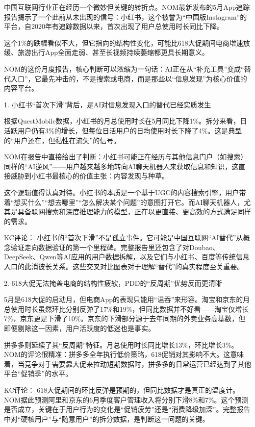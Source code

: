 \documentclass[11pt]{ctexart}
\begin{document}
中国互联网行业正在经历一个微妙但关键的转折点。NOM最新发布的5月App追踪报告揭示了一个此前从未出现的信号：小红书，这个被誉为“中国版Instagram”的平台，自2020年有追踪数据以来，首次出现了用户总使用时长同比下降。

这个1\%的跌幅看似不大，但它指向的结构性变化，可能比618大促期间电商增速放缓、旅游出行App全面走弱、甚至长视频持续萎缩都更具长期意义。

NOM的这份月度报告，核心判断可以浓缩为一句话：AI正在从“补充工具”变成“替代入口”，它最先冲击的，不是搜索或电商，而是那些以“信息发现”为核心价值的内容平台。

1. 小红书“首次下滑”背后，是AI对信息发现入口的替代已经实质发生

根据QuestMobile数据，小红书的月总使用时长在5月同比下降1\%。拆分来看，日活跃用户仍有3\%的增长，但每位日活用户的日均使用时长下降了4\%。这是典型的“用户还在，但黏性在流失”的信号。

NOM在报告中直接给出了判断：小红书可能正在经历与其他信息门户（如搜索）同样的“AI逆风”——用户越来越多地转向AI聊天机器人来获取信息和知识，这直接威胁到小红书最核心的价值主张：内容发现与种草。

这个逻辑值得认真对待。小红书的本质是一个基于UGC的内容搜索引擎，用户带着“想买什么”“想去哪里”“怎么解决某个问题”的意图打开它。而AI聊天机器人，尤其是具备联网搜索和深度推理能力的模型，正在以更直接、更高效的方式满足同样的需求。

KC评论： 小红书的“首次下滑”不是孤立事件。它可能是中国互联网“AI替代”从概念验证走向数据验证的第一个里程碑。完整报告里还包含了对Doubao、DeepSeek、Qwen等AI应用的用户数据拆解，以及它们与小红书、百度等传统信息入口的此消彼长关系。这些交叉对比图表对于理解“替代”的真实程度至关重要。

2. 618大促无法掩盖电商的结构性疲软，PDD的“反周期”优势反而更清晰

5月是618大促的启动月，但电商App的表现只能用“温吞”来形容。淘宝和京东的月总使用时长虽然环比分别反弹了17\%和19\%，但同比数据并不好看——淘宝仅增长7\%，京东更是下滑了10\%。京东的下滑部分源于去年同期的外卖业务高基数，但即便剔除这一因素，用户活跃度的低迷也是事实。

拼多多则延续了其“反周期”特征。月总使用时长同比增长13\%，环比增长3\%。NOM的评论很精准：拼多多全年执行低价策略，618促销对其影响不大。这意味着，当竞争对手需要靠大促来拉动短期数据时，拼多多的日常运营已经达到了其他平台“促销季”的水平。

KC评论： 618大促期间的环比反弹是预期的，但同比数据才是真正的温度计。NOM据此预测阿里和京东的6月季度客户管理收入将分别下滑8\%和7\%。这个预测是否成立，关键在于用户行为的变化是“促销疲劳”还是“消费降级加深”。完整报告中对“硬核用户”与“随意用户”的拆分数据，是判断这一问题的关键。
\end{document}
